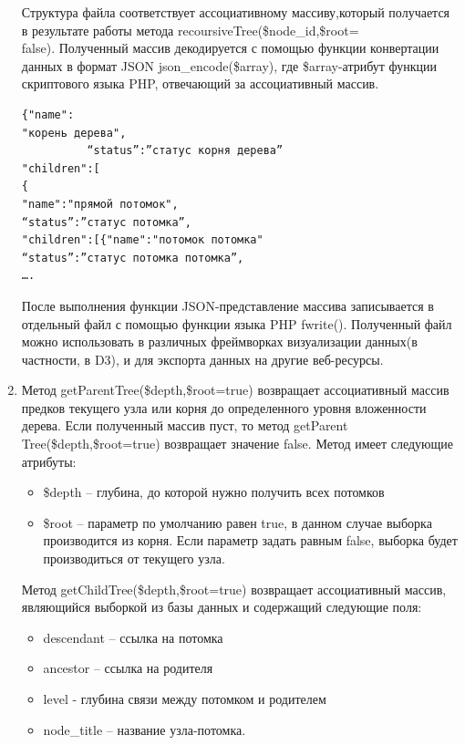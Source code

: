 \documentclass[a4paper,14pt]{extreport}
\theoremstyle{definition}
\begin{document}
\begin{enumerate}
Структура файла соответствует ассоциативному массиву,который получается в результате работы метода recoursiveTree(\$node\_id,\$root=\\false). Полученный массив декодируется с помощью функции конвертации данных в формат JSON json\_encode(\$array), где \$array-атрибут функции скриптового языка PHP, отвечающий за ассоциативный массив.
\begin{verbatim}{"name":
"корень дерева",
          “status”:”статус корня дерева”
"children":[
{
"name":"прямой потомок",
“status”:”статус потомка”,
"children":[{"name":"потомок потомка"
“status”:”статус потомка потомка”,
….\end{verbatim}
После выполнения функции JSON-представление массива записывается в отдельный файл с помощью функции языка PHP fwrite(). Полученный файл можно использовать в различных фреймворках визуализации данных(в частности, в D3), и для экспорта данных на другие веб-ресурсы.
\item Метод getParentTree(\$depth,\$root=true) возвращает ассоциативный массив предков текущего узла или корня до определенного уровня вложенности дерева. Если полученный массив пуст, то метод getParent\\Tree(\$depth,\$root=true) возвращает значение false.
Метод имеет следующие атрибуты:
\begin{itemize}
\item \$depth – глубина, до которой нужно получить всех потомков
\item \$root – параметр по умолчанию равен true, в данном случае выборка производится из корня. Если параметр задать равным false, выборка будет производиться от текущего узла.
\end{itemize}
Метод getChildTree(\$depth,\$root=true) возвращает ассоциативный массив, являющийся выборкой из базы данных и содержащий следующие поля:
\begin{itemize}
\item descendant – ссылка на потомка
\item ancestor – ссылка на родителя
\item level - глубина связи между потомком и родителем
\item node\_title – название узла-потомка.
\end{itemize}


\end{enumerate}
\end{document}
